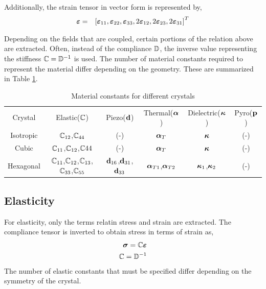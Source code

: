Additionally, the strain tensor in vector form is represented by,
\begin{eqnarray}
\boldsymbol{\varepsilon} &=& \left[ \boldsymbol{\varepsilon}_{11}, \boldsymbol{\varepsilon}_{22}, \boldsymbol{\varepsilon}_{33}, 2\boldsymbol{\varepsilon}_{12}, 2\boldsymbol{\varepsilon}_{23}, 2\boldsymbol{\varepsilon}_{31} \right]^T
\end{eqnarray}

Depending on the fields that are coupled, certain portions of the relation
above are extracted. Often, instead of the compliance $\mathbb{D}$, the inverse 
value representing the stiffness $\mathbb{C}=\mathbb{D}^{-1}$ is used. The number of 
material constants required to represent the material differ depending on
the geometry. 
These are summarized in Table \ref{table:CrystalDependentMaterialConstants}.

\begin{table}[htbp]
\centering
\caption{Material constants for different crystals}
\label{table:CrystalDependentMaterialConstants}
\begin{tabular}{|c||c|c|c|c|c|}
\hline
Crystal & Elastic($\mathbb{C}$) & Piezo($\mathbf{d}$) & Thermal($\boldsymbol{\alpha}$) & Dielectric($\boldsymbol{\kappa}$) & Pyro($\mathbf{p}$) \\
\hhline{|=||=|=|=|=|=|}
Isotropic & $\mathbb{C}_{12}$,$\mathbb{C}_{44}$ & (-)   & $\boldsymbol{\alpha}_T$     & $\boldsymbol{\kappa}$           & (-)          \\
\hline
Cubic     & $\mathbb{C}_{11}$,$\mathbb{C}_{12}$,$\mathbb{C}{44}$ & (-)& $\boldsymbol{\alpha}_T$         & $\boldsymbol{\kappa}$             & (-)          \\
\hline
Hexagonal & $\mathbb{C}_{11}$,$\mathbb{C}_{12}$,$\mathbb{C}_{13}$,$\mathbb{C}_{33}$,$\mathbb{C}_{55}$ & $\mathbf{d}_{16}$,$\mathbf{d}_{31}$,$\mathbf{d}_{33}$
                                          & $\boldsymbol{\alpha}_{T1}$,$\boldsymbol{\alpha}_{T2}$ 
                                                               & $\boldsymbol{\kappa}_1$,$\boldsymbol{\kappa}_2$& (-)         \\
\hline
\end{tabular}
\end{table}

\clearpage
\subsection{Elasticity }
For elasticity, only the terms relatin stress and strain are 
extracted. The compliance tensor is inverted to obtain stress in
terms of strain as,
\begin{eqnarray}
\boldsymbol{\sigma} = \mathbb{C}\boldsymbol{\varepsilon} \\
\mathbb{C}  = \mathbb{D}^{-1}
\end{eqnarray} 
The number of elastic constants that must be specified differ 
depending on the symmetry of the crystal.

